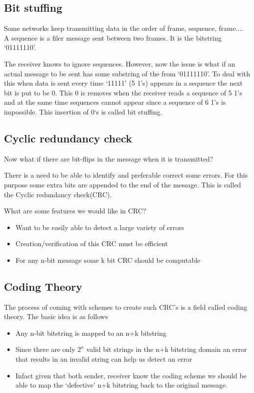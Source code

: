 \documentclass[12pt]{article}
\begin{document}
\subsection{Bit stuffing}

Some networks keep transmitting data in the order of frame, sequence, frame\(\dots\).
A sequence is a filer message sent between two frames. It is the bitstring `01111110'. 

The receiver knows to ignore sequences. However, now the issue is what if an actual message to be sent 
has some substring of the from `01111110'. To deal with this when data is sent every time `11111' (5 1's) appears in a
sequence the next bit is put to be 0. This 0 is removes when the receiver reads a sequence of 5 1's and at the same time 
sequences cannot appear since a sequence of 6 1's is impossible. This insertion of 0`s is called bit stuffing. 


\subsection{Cyclic redundancy check}
Now what if there are bit-flips in the message when it is transmitted?

There is a need to be able to identify and preferable correct some errors. For this purpose 
some extra bits are appended to the end of the message. This is called the Cyclic redundancy check(CRC).

What are some features we would like in CRC?

\begin{itemize}
    \item Want to be easily able to detect a large variety of errors
    \item Creation/verification of this CRC must be efficient
    \item For any n-bit message some k bit CRC should be computable
\end{itemize}


\subsection{Coding Theory}

The process of coming with schemes to create such CRC's is a field called coding theory. 
The basic idea is as follows 
\begin{itemize}
    \item Any n-bit bitstring is mapped to an n+k bitstring
    \item Since there are only \(2^n\) valid bit strings in the n+k bitstring 
    domain an error that results in an invalid string can help us detect an error
    \item Infact given that both sender, receiver know the coding scheme we should be 
    able to map the `defective' n+k bitstring back to the original message. 
\end{itemize}
\end{document}
